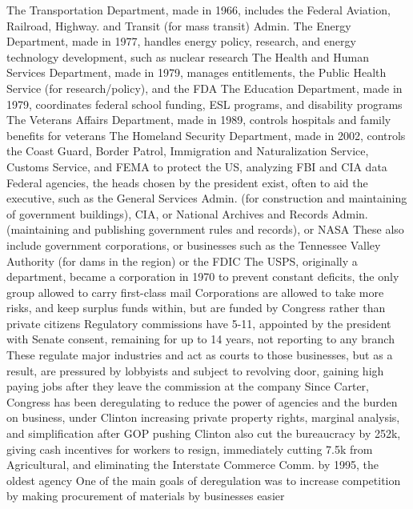 \documentclass[11 pt, twoside]{article}
\newenvironment{outline*}
{
	\begin{outline}[enumerate]
	}
	{\end{outline}
}
\begin{document}
\begin{outline*}
\2 The Transportation Department, made in 1966, includes the Federal Aviation, Railroad, Highway. and Transit (for mass transit) Admin.
\2 The Energy Department, made in 1977, handles energy policy, research, and energy technology development, such as nuclear research
\2 The Health and Human Services Department, made in 1979, manages entitlements, the Public Health Service (for research/policy), and the FDA
\2 The Education Department, made in 1979, coordinates federal school funding, ESL programs, and disability programs
\2 The Veterans Affairs Department, made in 1989, controls hospitals and family benefits for veterans
\2 The Homeland Security Department, made in 2002, controls the Coast Guard, Border Patrol, Immigration and Naturalization Service, Customs Service, and FEMA to protect the US, analyzing FBI and CIA data
\1 Federal agencies, the heads chosen by the president exist, often to aid the executive, such as the General Services Admin. (for construction and maintaining of government buildings), CIA, or National Archives and Records Admin. (maintaining and publishing government rules and records), or NASA
\2 These also include government corporations, or businesses such as the Tennessee Valley Authority (for dams in the region) or the FDIC
\2 The USPS, originally a department, became a corporation in 1970 to prevent constant deficits, the only group allowed to carry first-class mail
\2 Corporations are allowed to take more risks, and keep surplus funds within, but are funded by Congress rather than private citizens
\1 Regulatory commissions have 5-11, appointed by the president with Senate consent, remaining for up to 14 years, not reporting to any branch
\2 These regulate major industries and act as courts to those businesses, but as a result, are pressured by lobbyists and subject to revolving door, gaining high paying jobs after they leave the commission at the company
\2 Since Carter, Congress has been deregulating to reduce the power of agencies and the burden on business, under Clinton increasing private property rights, marginal analysis, and simplification after GOP pushing
\2 Clinton also cut the bureaucracy by 252k, giving cash incentives for workers to resign, immediately cutting 7.5k from Agricultural, and eliminating the Interstate Commerce Comm. by 1995, the oldest agency
\2 One of the main goals of deregulation was to increase competition by making procurement of materials by businesses easier
\end{outline*}
\end{document}
